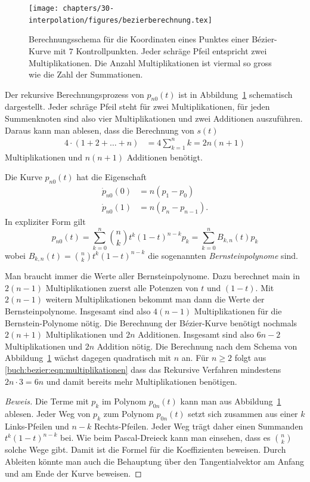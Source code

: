 \begin{figure}
\centering
\texttt{[image: chapters/30-interpolation/figures/bezierberechnung.tex]}
\caption{Berechnungsschema für die Koordinaten eines Punktes einer Bézier-Kurve
mit $7$ Kontrollpunkten.
Jeder schräge Pfeil entspricht zwei Multiplikationen.
Die Anzahl Multiplikationen ist viermal so gross wie die Zahl der Summationen.
\label{buch:bezier:figure:bezierberechnung}}
\end{figure}
Der rekursive Berechnungsprozess von $p_{n0}(t)$ ist in
Abbildung~\ref{buch:bezier:figure:bezierberechnung} schematisch
dargestellt.
Jeder schräge Pfeil steht für zwei Multiplikationen,
für jeden Summenknoten sind also vier Multiplikationen und zwei Additionen
auszuführen.
Daraus kann man ablesen, dass die Berechnung von $s(t)$ 
\begin{align}
4\cdot (1 + 2 + \dots + n) &= 4\sum_{k=1}^n k = 2n(n+1)
\label{buch:bezier:eqn:multiplikationen}
\end{align}
Multiplikationen und $n(n+1)$ Additionen benötigt.

\begin{satz}
\label{buch:bezier:satz}
Die Kurve $p_{n0}(t)$ hat die Eigenschaft
\begin{align*}
\dot{p}_{n0}(0) &= n (p_1-p_0)
\\
\dot{p}_{n0}(1) &= n (p_n-p_{n-1}).
\end{align*}
In expliziter Form gilt
\[
p_{n0}(t)
=
\sum_{k=0}^n \binom{n}{k} t^k(1-t)^{n-k} p_k
=
\sum_{k=0}^n B_{k,n}(t) p_k
\]
wobei $B_{k,n}(t) = \binom{n}{k}t^k(1-t)^{n-k}$
die sogenannten {\em Bernsteinpolynome} sind.
\end{satz}

Man braucht immer die Werte aller Bernsteinpolynome.
Dazu berechnet main in $2(n-1)$ Multiplikationen zuerst alle
Potenzen von $t$ und $(1-t)$.
Mit $2(n-1)$ weitern Multiplikationen bekommt man dann die Werte
der Bernsteinpolynome.
Insgesamt sind also $4(n-1)$ Multiplikationen für die Bernstein-Polynome
nötig.
Die Berechnung der Bézier-Kurve benötigt nochmals $2(n+1)$ Multiplikationen
und $2n$ Additionen.
Insgesamt sind also $6n-2$ Multiplikationen und $2n$ Addition nötig.
Die Berechnung nach dem Schema von 
Abbildung~\ref{buch:bezier:figure:bezierberechnung} wächst dagegen 
quadratisch mit $n$ an.
Für $n\ge 2$ folgt aus \eqref{buch:bezier:eqn:multiplikationen}
dass das Rekursive Verfahren mindestens $2n\cdot 3=6n$ und damit
bereits mehr Multiplikationen benötigen.

\begin{proof}[Beweis]
Die Terme mit $p_k$ im Polynom $p_{0n}(t)$ kann man aus
Abbildung~\ref{buch:bezier:figure:bezierberechnung} ablesen.
Jeder Weg von $p_k$ zum Polynom $p_{0n}(t)$ setzt sich zusammen aus
einer $k$ Links-Pfeilen und $n-k$ Rechts-Pfeilen.
Jeder Weg trägt daher einen Summanden $t^k(1-t)^{n-k}$ bei.
Wie beim Pascal-Dreieck kann man einsehen, dass es $\binom{n}{k}$
solche Wege gibt.
Damit ist die Formel für die Koeffizienten beweisen.
Durch Ableiten könnte man auch die Behauptung über den Tangentialvektor
am Anfang und am Ende der Kurve beweisen.
\end{proof}

